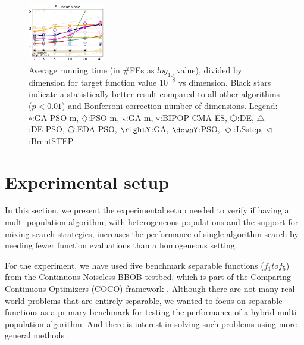 \documentclass[runningheads]{llncs}
\begin{document}
\begin{figure}[h!tb]
\begin{tabular}
  \includegraphics[width=0.30\textwidth]{ppfigs_f005}
  \end{tabular}
  \vspace{-3ex}
   \caption{Average running time (in \#FEs as $log_{10}$ value),
    divided by dimension for target function value $10^{-8}$ vs dimension. 
    Black stars indicate a statistically better result compared to 
    all other algorithms ($p < 0.01$) and Bonferroni 
    correction number of dimensions. 
    Legend: {\color{NavyBlue}$\circ$}:GA-PSO-m, 
    {\color{Magenta}$\diamondsuit$}:PSO-m, 
    {\color{Orange}$\star$}:GA-m, 
    {\color{CornflowerBlue}$\triangledown$}:BIPOP-CMA-ES,
    {\color{red}$\varhexagon$}:DE, 
    {\color{YellowGreen}$\triangle$}:DE-PSO, 
    {\color{cyan}$\pentagon$}:EDA-PSO, 
    {\color{GreenYellow}$\rightY$}:GA, 
    {\color{ForestGreen}$\downY$}:PSO, 
    {\color{Lavender}$\Diamond$}:LSstep, 
    {\color{SkyBlue}$\triangleleft$}:BrentSTEP
    } 
  \label{fig:avg}
\end{figure}
%


\section{Experimental setup}
\label{setup}

In this section, we present the experimental setup needed 
to verify if having a multi-population algorithm, with
heterogeneous populations and the support for mixing search strategies,
increases the performance of single-algorithm search by needing fewer function evaluations
than a homogeneous setting. %

For the experiment, we have used five
benchmark separable functions ($f_1 to f_5 $) from the Continuous Noiseless
BBOB testbed, which is part of the Comparing Continuous Optimizers (COCO)
framework \cite{hansen2016coco}. Although there are not many real-world
problems that are entirely separable, we wanted to focus on separable functions
as a primary benchmark for testing the performance of a hybrid multi-population
algorithm. And there is interest in solving such problems using more
general methods \cite{doerr2013evolutionary,swarzberg1994step}. %
\end{document}
